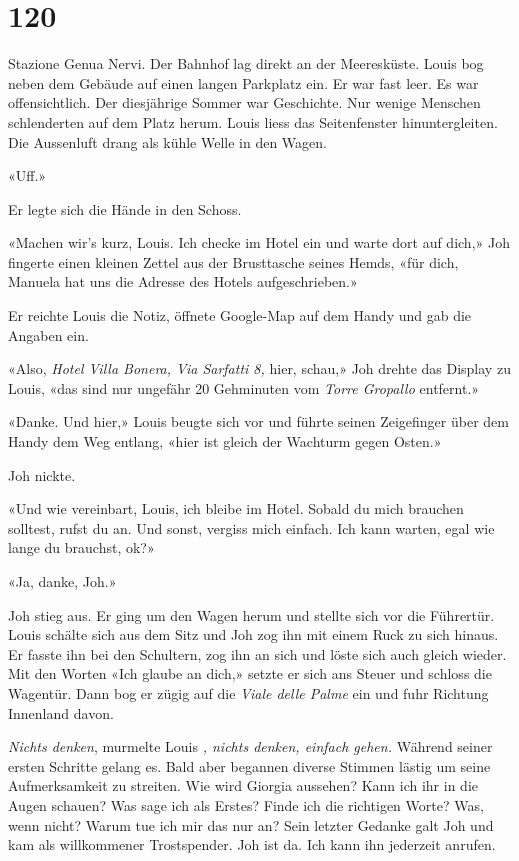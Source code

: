 \chapter{120}



Stazione Genua Nervi.
Der Bahnhof lag direkt an der Meeresküste.
Louis bog neben dem Gebäude auf einen langen Parkplatz ein. Er war fast
leer. Es war offensichtlich. Der diesjährige Sommer war Geschichte. Nur
wenige Menschen schlenderten auf dem Platz herum.
Louis liess das Seitenfenster hinuntergleiten. Die Aussenluft drang
als kühle Welle in den Wagen.

«Uff.»

Er legte sich die Hände in den Schoss.

«Machen wir’s kurz, Louis. Ich checke im Hotel ein und warte dort auf
dich,» Joh fingerte einen kleinen Zettel aus der Brusttasche seines
Hemds, «für dich, Manuela hat uns die Adresse des Hotels
aufgeschrieben.»

Er reichte Louis die Notiz, öffnete Google-Map auf dem Handy und gab die
Angaben ein.

«Also, \emph{Hotel Villa Bonera, Via Sarfatti 8,} hier, schau,» Joh
drehte das Display zu Louis, «das sind nur ungefähr 20 Gehminuten vom
\emph{Torre Gropallo} entfernt.»

«Danke. Und hier,» Louis beugte sich vor und führte seinen Zeigefinger
über dem Handy dem Weg entlang, «hier ist gleich der Wachturm gegen
Osten.»

Joh nickte.

«Und wie vereinbart, Louis, ich bleibe im Hotel. Sobald du mich brauchen
solltest, rufst du an. Und sonst, vergiss mich einfach. Ich kann warten,
egal wie lange du brauchst, ok?»

«Ja, danke, Joh.»

Joh stieg aus. Er ging um den Wagen herum und
stellte sich vor die Führertür. Louis schälte sich aus dem Sitz und Joh
zog ihn mit einem Ruck zu sich hinaus. Er fasste ihn bei den Schultern,
zog ihn an sich und löste sich auch gleich wieder.
Mit den Worten «Ich glaube an dich,» setzte er sich ans Steuer und
schloss die Wagentür. Dann bog er zügig auf die \emph{Viale delle Palme}
ein und fuhr Richtung Innenland davon.

\emph{Nichts denken}, murmelte Louis \emph{, nichts denken,
einfach gehen.} Während seiner ersten Schritte gelang es. Bald aber
begannen diverse Stimmen lästig um seine Aufmerksamkeit zu streiten. 
Wie wird Giorgia aussehen? Kann ich ihr in die Augen schauen? 
Was sage ich als Erstes? Finde ich die richtigen Worte? Was, wenn nicht? 
Warum tue ich mir das nur an? Sein letzter Gedanke galt Joh und kam als willkommener Trostspender. Joh ist da. Ich kann ihn jederzeit anrufen.

